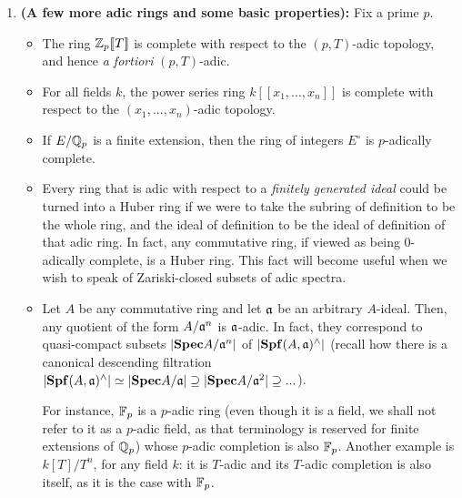                 \begin{example} \label{example: huber_rings}
                    \noindent
                    \begin{enumerate}
                        \item \textbf{(A few more adic rings and some basic properties):} Fix a prime $p$.
                            \begin{itemize}
                                \item The ring $\mathbb{Z}_p[\![T]\!]$ is complete with respect to the $(p, T)$-adic topology, and hence \textit{a fortiori} $(p, T)$-adic. 
                                \item For all fields $k$, the power series ring $k[\![x_1, ..., x_n]\!]$ is complete with respect to the $(x_1, ..., x_n)$-adic topology.
                                \item If $E/\mathbb{Q}_p$ is a finite extension, then the ring of integers $E^{\circ}$ is $p$-adically complete. 
                                \item Every ring that is adic with respect to a \textit{finitely generated ideal} could be turned into a Huber ring if we were to take the subring of definition to be the whole ring, and the ideal of definition to be the ideal of definition of that adic ring. In fact, any commutative ring, if viewed as being $0$-adically complete, is a Huber ring. This fact will become useful when we wish to speak of Zariski-closed subsets of adic spectra.
                                \item Let $A$ be any commutative ring and let $\mathfrak{a}$ be an arbitrary $A$-ideal. Then, any quotient of the form $A/\mathfrak{a}^n$ is $\mathfrak{a}$-adic. In fact, they correspond to quasi-compact subsets $|\mathbf{Spec} A/\mathfrak{a}^n|$ of $|\mathbf{Spf} (A, \mathfrak{a})^{\wedge}|$ (recall how there is a canonical descending filtration $|\mathbf{Spf} (A, \mathfrak{a})^{\wedge}| \simeq |\mathbf{Spec} A/\mathfrak{a}| \supseteq |\mathbf{Spec} A/\mathfrak{a}^2| \supseteq ...$).
                                
                                For instance, $\mathbb{F}_p$ is a $p$-adic ring (even though it is a field, we shall not refer to it as a $p$-adic field, as that terminology is reserved for finite extensions of $\mathbb{Q}_p$) whose $p$-adic completion is also $\mathbb{F}_p$. Another example is $k[T]/T^n$, for any field $k$: it is $T$-adic and its $T$-adic completion is also itself, as it is the case with $\mathbb{F}_p$. 
                                

\end{itemize}
\end{enumerate}
\end{example}
